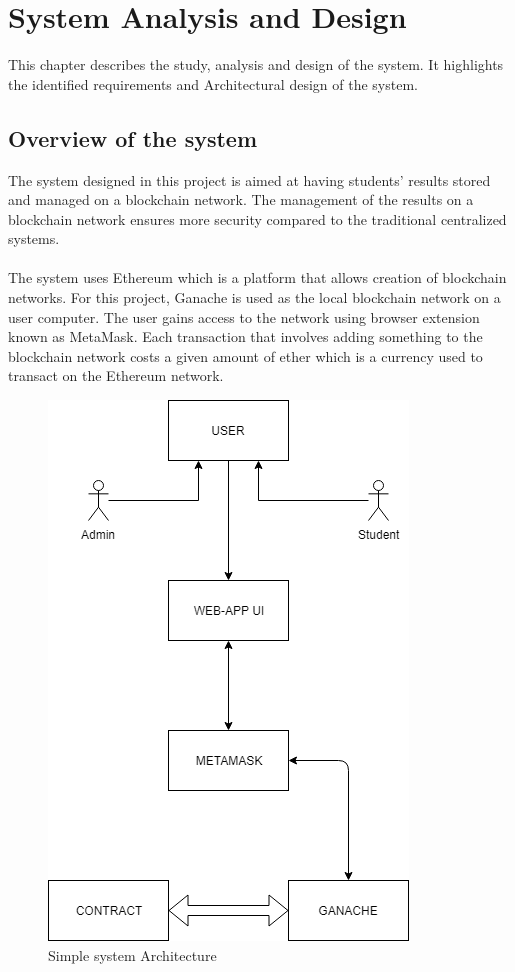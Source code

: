 
\chapter{System Analysis and Design}
This chapter describes the study, analysis and design of the system. It highlights the identified requirements and Architectural design of the system.

\section{Overview of the system}
The system designed in this project is aimed at having students’ results stored and managed on a blockchain network. The management of the results on a blockchain network ensures more security compared to the traditional centralized systems. \\~\\
The system uses Ethereum which is a platform that allows creation of blockchain networks. For this project, Ganache is used as the local blockchain network on a user computer. The user gains access to the network using browser extension known as MetaMask. Each transaction that involves adding something to the blockchain network costs a given amount of ether which is a currency used to transact on the Ethereum network.

\begin{figure}[!h]
\centering
\includegraphics[scale=0.7]{images/simple_system.png}
\caption{Simple system Architecture}
\end{figure}

